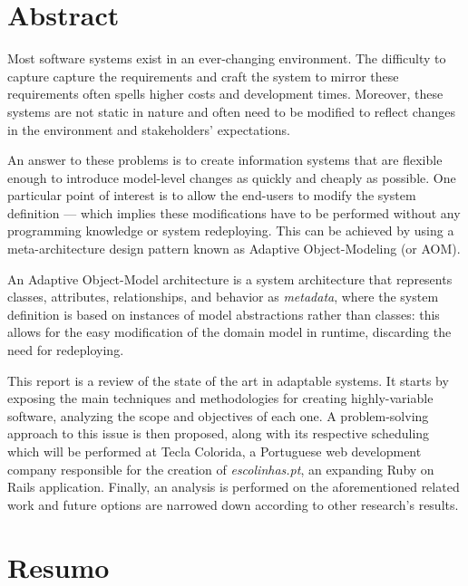 \chapter*{Abstract}

Most software systems exist in an ever-changing environment. The difficulty to capture capture the requirements and craft the system to mirror these requirements often spells higher costs and development times. Moreover, these systems are not static in nature and often need to be modified to reflect changes in the environment and stakeholders' expectations.

An answer to these problems is to create information systems that are flexible enough to introduce model-level changes as quickly and cheaply as possible. One particular point of interest is to allow the end-users to modify the system definition --- which implies these modifications have to be performed without any programming knowledge or system redeploying. This can be achieved by using a meta-architecture design pattern known as Adaptive Object-Modeling (or AOM).

An Adaptive Object-Model architecture is a system architecture that represents classes, attributes, relationships, and behavior as \emph{metadata}, where the system definition is based on instances of model abstractions rather than classes: this allows for the easy modification of the domain model in runtime, discarding the need for redeploying.

This report is a review of the state of the art in adaptable systems. It starts by exposing the main techniques and methodologies for creating highly-variable software, analyzing the scope and objectives of each one. A problem-solving approach to this issue is then proposed, along with its respective scheduling which will be performed at Tecla Colorida, a Portuguese web development company responsible for the creation of \emph{escolinhas.pt}, an expanding Ruby on Rails application. Finally, an analysis is performed on the aforementioned related work and future options are narrowed down according to other research's results.

\chapter*{Resumo}


